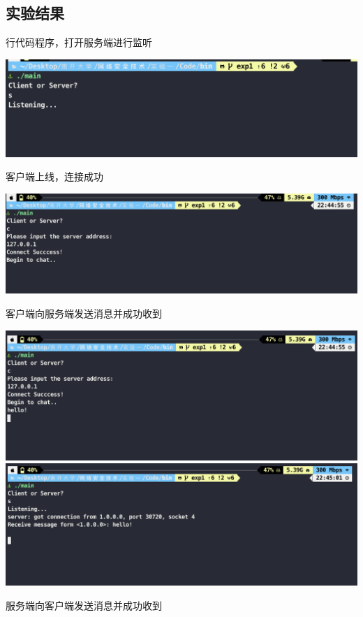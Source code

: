 \documentclass[UTF8,a4paper,10pt]{ctexart}
\begin{document}
\subsection{实验结果}
行代码程序，打开服务端进行监听
\begin{center}
  \includegraphics[scale = 0.5]{1}
\end{center}
客户端上线，连接成功
\begin{center}
  \includegraphics[scale = 0.5]{2}
\end{center}
客户端向服务端发送消息并成功收到
\begin{center}
  \includegraphics[scale = 0.5]{3}
  \includegraphics[scale = 0.5]{4}
\end{center}
服务端向客户端发送消息并成功收到
\end{document}
